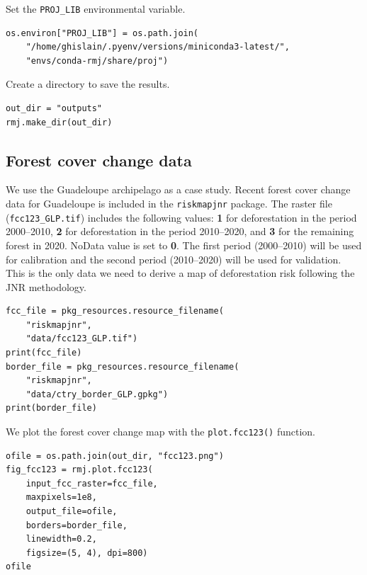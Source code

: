 \documentclass[paper=a4, 12pt, DIV=12]{scrartcl}
\begin{document}
Set the \texttt{PROJ\_LIB} environmental variable.

\begin{verbatim}
os.environ["PROJ_LIB"] = os.path.join(
    "/home/ghislain/.pyenv/versions/miniconda3-latest/",
    "envs/conda-rmj/share/proj")
\end{verbatim}

Create a directory to save the results.

\begin{verbatim}
out_dir = "outputs"
rmj.make_dir(out_dir)
\end{verbatim}

\subsection{Forest cover change data}
\label{sec:orge065873}

We use the Guadeloupe archipelago as a case study. Recent forest cover change data for Guadeloupe is included in the \texttt{riskmapjnr} package. The raster file (\texttt{fcc123\_GLP.tif}) includes the following values: \textbf{1} for deforestation in the period 2000--2010, \textbf{2} for deforestation in the period 2010--2020, and \textbf{3} for the remaining forest in 2020. NoData value is set to \textbf{0}. The first period (2000--2010) will be used for calibration and the second period (2010--2020) will be used for validation. This is the only data we need to derive a map of deforestation risk following the JNR methodology.

\begin{verbatim}
fcc_file = pkg_resources.resource_filename(
    "riskmapjnr",
    "data/fcc123_GLP.tif")
print(fcc_file)
border_file = pkg_resources.resource_filename(
    "riskmapjnr",
    "data/ctry_border_GLP.gpkg")
print(border_file)
\end{verbatim}

We plot the forest cover change map with the \texttt{plot.fcc123()} function.

\begin{verbatim}
ofile = os.path.join(out_dir, "fcc123.png")
fig_fcc123 = rmj.plot.fcc123(
    input_fcc_raster=fcc_file,
    maxpixels=1e8,
    output_file=ofile,
    borders=border_file,
    linewidth=0.2,
    figsize=(5, 4), dpi=800)
ofile
\end{verbatim}
\end{document}
